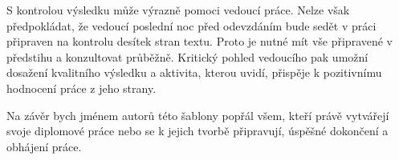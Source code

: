 S kontrolou výsledku může výrazně pomoci vedoucí práce. Nelze však předpokládat, že vedoucí poslední noc před odevzdáním bude sedět v práci připraven na kontrolu desítek stran textu. Proto je nutné mít vše připravené v předstihu a konzultovat průběžně. Kritický pohled vedoucího pak umožní dosažení kvalitního výsledku a aktivita, kterou uvidí, přispěje k pozitivnímu hodnocení práce z jeho strany.

Na závěr bych jménem autorů této šablony popřál všem, kteří právě vytvářejí svoje diplomové práce nebo se k jejich tvorbě připravují, úspěšné dokončení a obhájení práce.






